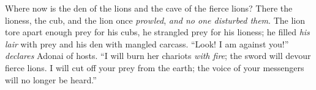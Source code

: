 \begin{biblechapter}
 Where now is the den of the lions 
and the cave of the fierce lions? 
There the lioness, the cub, and the lion once \textit{prowled}, 
\textit{and no one disturbed them}.
\verse The lion tore apart enough prey for his cubs, 
he strangled prey for his lioness; 
he filled \textit{his lair} with prey 
and his den with mangled carcass.
\verse “Look! I am against you!” \textit{declares} Adonai of hosts. 
“I will burn her chariots \textit{with fire}; 
the sword will devour fierce lions. 
I will cut off your prey from the earth; 
the voice of your messengers will no longer be heard.”
\end{biblechapter}

